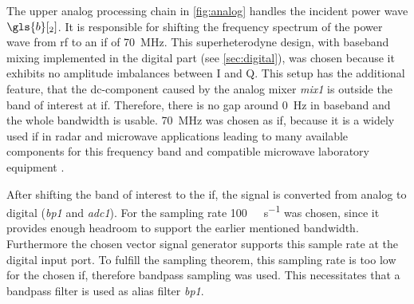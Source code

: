 \documentclass[12pt,a4paper,parskip=full,abstract=true,BCOR=12mm]{scrreprt}
\def\device#1{\mbox{\textit{#1}}}
\begin{document}
The upper analog processing chain in \cref{fig:analog} handles the
incident power wave $\gls{b}[_2]$. It is responsible for shifting the frequency spectrum
of the power wave from \gls{rf} to an \gls{if} of \SI{70}{\mega\hertz}. This
superheterodyne design, with baseband mixing implemented in the digital
part (see \cref{sec:digital}), was chosen because it exhibits no amplitude
imbalances between I and Q. This setup has the additional feature, that
the \gls{dc}-component caused by the analog mixer \device{mix1} is outside the
band of interest at \gls{if}. Therefore, there is no gap around \SI{0}{\hertz} in baseband
and the whole bandwidth is usable. \SI{70}{\mega\hertz} was chosen as \gls{if},
because it is a widely used \gls{if} in radar and microwave applications
\cite{tozer_broadcast_2004,ahamed_design_1997,whitaker_rf_2002,penttinen_telecommunications_2015}
leading to many available components for this frequency band and compatible microwave
laboratory equipment \cite{agilent_h70}.

After shifting the band of interest to the \gls{if}, the signal is converted from
analog to digital (\device{bp1} and \device{adc1}). For the sampling rate
\SI{100}{\mega\samples\per\second} was chosen, since it provides enough headroom to
support the earlier mentioned bandwidth. Furthermore the chosen vector signal generator supports this sample rate
at the digital input port. To fulfill the sampling theorem, this sampling rate is too low for the chosen
\gls{if}, therefore bandpass sampling was used. This necessitates that a bandpass
filter is used as alias filter \device{bp1}.
\end{document}
